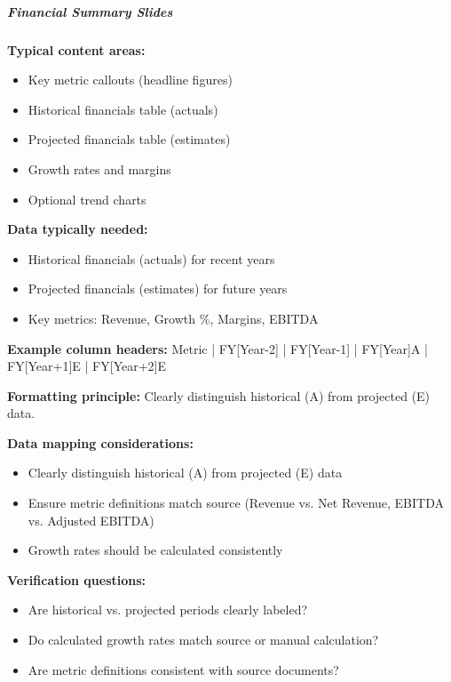 \documentclass[11pt]{article}
\begin{document}
\subparagraph{Financial Summary Slides}\mbox{}\par

\textbf{Typical content areas:}

\begin{itemize}[leftmargin=*,itemsep=2pt,topsep=2pt]
\item {} Key metric callouts (headline figures)
\item {} Historical financials table (actuals)
\item {} Projected financials table (estimates)
\item {} Growth rates and margins
\item {} Optional trend charts
\end{itemize}

\textbf{Data typically needed:}

\begin{itemize}[leftmargin=*,itemsep=2pt,topsep=2pt]
\item {} Historical financials (actuals) for recent years
\item {} Projected financials (estimates) for future years
\item {} Key metrics: Revenue, Growth \%, Margins, EBITDA
\end{itemize}

\textbf{Example column headers:} Metric | FY[Year-2] | FY[Year-1] | FY[Year]A | FY[Year+1]E | FY[Year+2]E


\textbf{Formatting principle:} Clearly distinguish historical (A) from projected (E) data.


\textbf{Data mapping considerations:}

\begin{itemize}[leftmargin=*,itemsep=2pt,topsep=2pt]
\item {} Clearly distinguish historical (A) from projected (E) data
\item {} Ensure metric definitions match source (Revenue vs. Net Revenue, EBITDA vs. Adjusted EBITDA)
\item {} Growth rates should be calculated consistently
\end{itemize}

\textbf{Verification questions:}

\begin{itemize}[leftmargin=*,itemsep=2pt,topsep=2pt]
\item {} Are historical vs. projected periods clearly labeled?
\item {} Do calculated growth rates match source or manual calculation?
\item {} Are metric definitions consistent with source documents?
\end{itemize}
\end{document}
